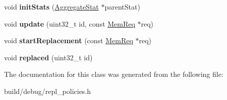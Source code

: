 \begin{DoxyCompactItemize}
\item 
\hypertarget{classProfViolReplPolicy_a386dca240e3305a99b077f9dc6949f04}{void {\bfseries init\-Stats} (\hyperlink{classAggregateStat}{Aggregate\-Stat} $\ast$parent\-Stat)}\label{classProfViolReplPolicy_a386dca240e3305a99b077f9dc6949f04}

\item 
\hypertarget{classProfViolReplPolicy_ab463dd1014ffe813a31216e3a55ba2a9}{void {\bfseries update} (uint32\-\_\-t id, const \hyperlink{structMemReq}{Mem\-Req} $\ast$req)}\label{classProfViolReplPolicy_ab463dd1014ffe813a31216e3a55ba2a9}

\item 
\hypertarget{classProfViolReplPolicy_a7c2e6d39c29c16e37571addbf39e3aaa}{void {\bfseries start\-Replacement} (const \hyperlink{structMemReq}{Mem\-Req} $\ast$req)}\label{classProfViolReplPolicy_a7c2e6d39c29c16e37571addbf39e3aaa}

\item 
\hypertarget{classProfViolReplPolicy_a0dc71739c20a5df5d621a41a07323247}{void {\bfseries replaced} (uint32\-\_\-t id)}\label{classProfViolReplPolicy_a0dc71739c20a5df5d621a41a07323247}

\end{DoxyCompactItemize}


The documentation for this class was generated from the following file\-:\begin{DoxyCompactItemize}
\item 
build/debug/repl\-\_\-policies.\-h\end{DoxyCompactItemize}
